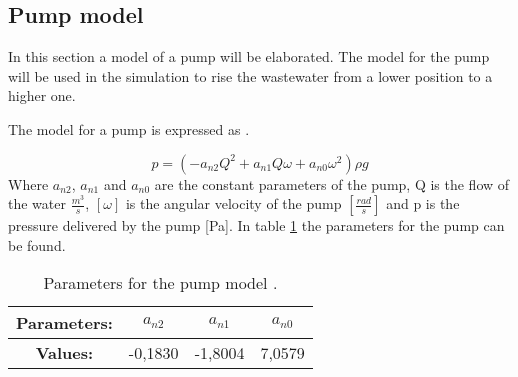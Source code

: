 \subsection{Pump model}\label{se:pump_model}
In this section a model of a pump will be elaborated. The model for the pump will be used in the simulation to rise the wastewater from a lower position to a higher one. 

 The model for a pump is expressed as \cite{kallesoe_pump}.

\begin{equation}\label{sec:eq_pump_exp}
p= (-a_{n2}Q^2+a_{n1}Q\omega+a_{n0}\omega^2)\rho g
\end{equation}
Where $a_{n2}$, $a_{n1}$ and $a_{n0}$ are the constant parameters of the pump, Q is the flow of the water $\frac{m^3}{s}$, $[\omega]$ is the angular velocity of the pump $[\frac{rad}{s}]$ and p is the pressure delivered by the pump [Pa]. In table \ref{tab:pump_parameters} the parameters for the pump can be found.
\begin{table}[H]
\centering
\begin{tabular}{|c|c|c|c|}
\hline
\rowcolor[HTML]{9B9B9B} 
\textbf{Parameters:}                     & \textbf{$a_{n2}$} & \textbf{$a_{n1}$} & \textbf{$a_{n0}$} \\ \hline
\cellcolor[HTML]{9B9B9B}\textbf{Values:} & -0,1830           & -1,8004            & 7,0579              \\ \hline
\end{tabular}
\caption{Parameters for the pump model \cite{kallesoe_pump}.}
\label{tab:pump_parameters}
\end{table}